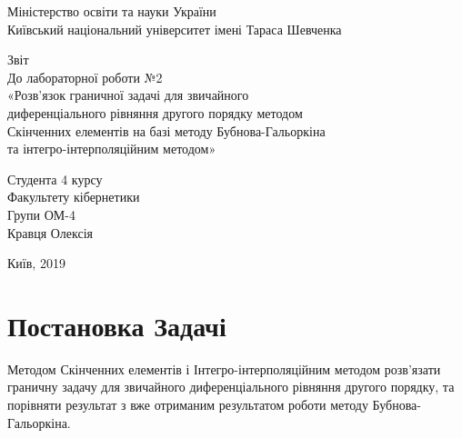 \documentclass[14pt,a4paper]{scrartcl}
\begin{document}
	\begin{titlepage}
		\begin{center}
			\small{Міністерство освіти та науки України}\\
			\small{Київський національний університет імені Тараса Шевченка}\\
		\end{center}
			\vspace{15em}
		\begin{center}
			\large{Звіт}\\
			\large{До лабораторної роботи №2}\\
			\large{«Розв’язок граничної задачі для звичайного}\\
			\large{диференціального рівняння  другого порядку методом}\\
			\large{Скінченних елементів на базі методу Бубнова-Гальоркіна}\\
			\large{та інтегро-інтерполяційним методом»}\\			
		\end{center}
			
		\vspace{10em}
		

	
		\begin{flushright}
			Студента 4 курсу\\
			Факультету кібернетики\\
			Групи ОМ-4\\
			Кравця Олексія\\
			
		\end{flushright}
		
		\vspace{\fill}

		
		\begin{center}
			\small{Київ, 2019}
		\end{center}
	
	\end{titlepage}


	\newpage

	\section{Постановка Задачі}
	Методом Скінченних елементів і Інтегро-інтерполяційним методом розв'язати граничну задачу для звичайного диференціального рівняння другого порядку, та порівняти результат з вже отриманим результатом роботи методу Бубнова-Гальоркіна.
\end{document}
